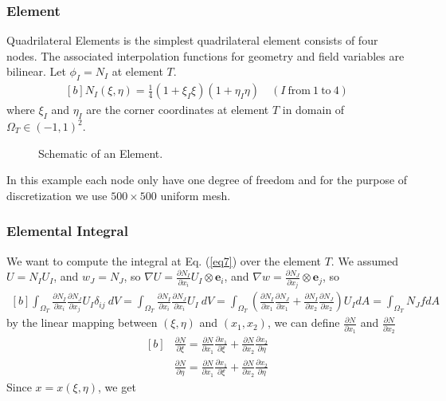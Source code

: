 \documentclass[]{article}
\begin{document}
\subsubsection{Element} \label{sec: elem}
Quadrilateral Elements is the simplest quadrilateral element consists of
four nodes. The associated interpolation functions for geometry and ﬁeld
variables are bilinear. Let $\phi_{I}=N_I $ at element $T$.
\begin{equation}\label{eq11}
	\begin{aligned}[b]
		N_{I}(\xi, \eta) = \frac{1}{4}(1+\xi_I\xi)(1+\eta_I\eta) \quad (I \ \text{from} \ 1 \ \text{to} \ 4)
	\end{aligned}
\end{equation}
where $\xi_{I}$ and $\eta_{I}$ are the corner coordinates at element $T$ in domain of $\Omega_{T} \in (-1,1)^2$.

\begin{figure}[htbp]
	\centering
	
	\caption{Schematic of an Element.}
	\label{fig_el}
\end{figure}
%
In this example each node only have one degree of freedom and for the purpose of discretization we use $500 \times 500$ uniform mesh.
\subsubsection{Elemental Integral} \label{sec: elem int}
  We want to compute the integral at Eq. (\ref{eq7}) over the element $T$. We assumed $U=N_I U_I$, and $w_J = N_J$, so $\nabla U= \frac{\partial N_I}{\partial x_i} U_I \otimes \mathbf{e}_i$, and  $\nabla w= \frac{\partial N_J}{\partial x_j}  \otimes \mathbf{e}_j$, so 
\begin{equation}\label{eq12}
	\begin{aligned}[b]
		\int_{\Omega_{T}} \frac{\partial N_I}{\partial x_i} \frac{\partial N_J}{\partial x_j} U_I \delta_{ij} \ dV = \int_{\Omega_{T}} \frac{\partial N_I}{\partial x_i} \frac{\partial N_J}{\partial x_i} U_I \ dV= \int_{\Omega_{T}} (\frac{\partial N_I}{\partial x_{1}}
		\frac{\partial N_J}{\partial x_{1}} + \frac{\partial N_I}{\partial x_{2}} 
		\frac{\partial N_J}{\partial x_{2}})U_I dA = \int_{\Omega_{T}} N_J f dA
	\end{aligned}
\end{equation}
by the linear mapping between $(\xi,\eta)$ and $(x_{1},x_2)$, we can define $\frac{\partial N}{\partial x_{1}}$ and $\frac{\partial N}{\partial x_{2}}$
\begin{equation}\label{eq13}
	\begin{aligned}[b]
&
		\frac{\partial N}{\partial \xi} = \frac{\partial N}{\partial x_{1}}\frac{\partial x_{1}}{\partial \xi}+\frac{\partial N}{\partial x_{2}}\frac{\partial x_{2}}{\partial \eta}\\
& 
		\frac{\partial N}{\partial \eta} = \frac{\partial N}{\partial x_{1}}\frac{\partial x_{1}}{\partial \xi}+\frac{\partial N}{\partial x_{2}}\frac{\partial x_{2}}{\partial \eta}
	\end{aligned}
\end{equation}
Since $x=x(\xi,\eta)$, we get
\end{document}
